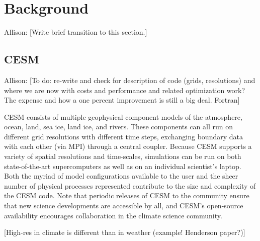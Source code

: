 
\section{Background}\label{sec:back}

{\color{red} Allison:} [Write brief transition to this section.]

\subsection{CESM}

{\color{red} Allison:} [To do: re-write and check for description of code (grids, resolutions) and where we are now with costs and performance and related optimization work? The expense and how a one percent improvement is still a big deal.
Fortran]


CESM consists of multiple geophysical component models of the atmosphere, ocean, land, sea ice, land ice, and rivers.  These components can all run on different grid resolutions with different time steps, exchanging boundary data with each other (via MPI) through a central coupler.  Because CESM supports a variety of spatial resolutions and time-scales, simulations can be run on both state-of-the-art supercomputers as well as on an individual scientist's laptop.  Both the myriad of model configurations available to the user and the sheer number of physical processes represented contribute to the size and complexity of the CESM code.  Note that periodic releases of CESM to the community ensure that new science developments are accessible by all, and CESM's open-source availability encourages collaboration in the climate science community.

[High-res in climate is different than in weather (example! Henderson paper?)]


